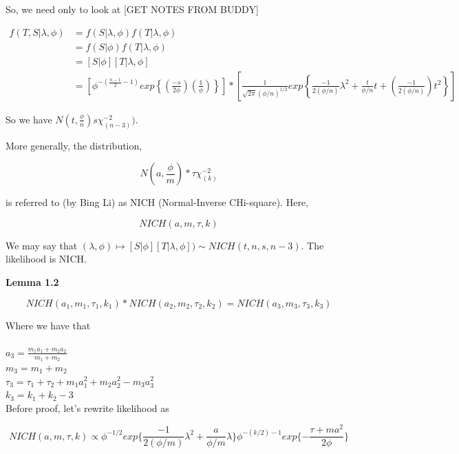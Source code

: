 \documentclass[11pt,fleqn]{book} %
\begin{document}
So, we need only to look at [GET NOTES FROM BUDDY]


	\begin{align*}
		f(T, S |\lambda, \phi) &= f(S|\lambda, \phi) f(T|\lambda,\phi)\\
			&=f(S|\phi) f(T|\lambda, \phi)\\
			&=[S|\phi] [T|\lambda, \phi]\\
			&= \left[\phi^{-(\frac{n-1}{2} - 1)} exp\left\{(\frac{-s}{2\phi})(\frac{1}{\phi})\right\}\right] * \left[\frac{1}{\sqrt{2\pi} (\phi/n)^{1/2}} exp\left\{\frac{-1}{2(\phi/n)}\lambda^2 + \frac{t}{\phi/n}t + (\frac{-1}{2(\phi/n)})t^2\right \} \right]
	\end{align*}

	So we have $N(t, \frac{\phi}{n}) s\chi^{-2}_{(n-3)})$. 

	More generally, the distribution, 

			$$N(a, \frac{\phi}{m}) * \tau \chi^{-2}_{(k)} $$

	is referred to (by Bing Li) as NICH (Normal-Inverse CHi-square). Here, 

			$$NICH(a, m, \tau, k)$$


	We may say that $(\lambda, \phi) \mapsto [S|\phi][T|\lambda, \phi]) \sim NICH(t,n,s, n-3)$. The likelihood is NICH. 


\textbf{Lemma 1.2} 

		$$NICH(a_1, m_1, \tau_1, k_1) * NICH(a_2, m_2, \tau_2, k_2) = NICH(a_3, m_3, \tau_3, k_3)$$


		Where we have that\\
\\
		$a_3 = \frac{m_1a_1 + m_2a_2}{m_1 + m_2}$\\
		$m_3 = m_1 + m_2$\\
		$\tau_3 = \tau_1 + \tau_2 + m_1a_1^2 + m_2a_2^2 - m_3a_3^2$\\
		$k_3 = k_1 + k_2 -3$\\


Before proof, let's rewrite likelihood as

		$$NICH(a, m, \tau, k) \propto  \phi^{-1/2}exp\{\frac{-1}{2(\phi/m)}\lambda^2 + \frac{a}{\phi/m}\lambda\} \phi^{-(k/2) - 1} exp\{-\frac{\tau + ma^2}{2\phi}\}$$
\end{document}
